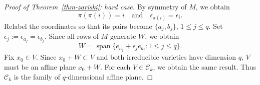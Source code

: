 \documentclass[11pt,reqno]{amsart}
\theoremstyle{definition}
\theoremstyle{plain}
\numberwithin{equation}{section}
\begin{document}
\begin{proof}[Proof of Theorem~\ref{thm-zariski}: hard case]
    By symmetry of $M$, we obtain
    \begin{equation*}
        \pi(\pi(i))=i \quad \text{and}\quad \epsilon_{\pi(i)}=\epsilon_i.
    \end{equation*}
    Relabel the coordinates so that its pairs become $\lbrace a_j,b_j\rbrace$, $1\le j\le q$. Set $\epsilon_j:=\epsilon_{a_j}=\epsilon_{b_j}$. Since all rows of $M$ generate $W$, we obtain
    \begin{equation}\label{eq:paired-space}
        W=\operatorname{span}\lbrace e_{a_j}+\epsilon_je_{b_j}:1\le j\le q\rbrace.
    \end{equation}
    Fix $x_0\in V$. Since $x_0+W\subset V$ and both irreducible varieties have dimension $q$, $V$ must be an affine plane $x_0+W$. For each $V\in\mathcal{C}_k$, we obtain the same result. Thus $\mathcal{C}_k$ is the family of $q$-dimensional affine plane.


\end{proof}
\end{document}
